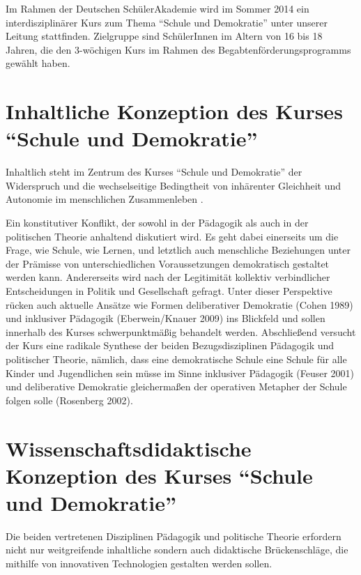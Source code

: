 \documentclass[11pt,a4paper,oneside]{article}
\begin{document}


Im Rahmen der Deutschen SchülerAkademie wird im Sommer 2014 ein interdisziplinärer Kurs zum Thema ``Schule und Demokratie'' unter unserer Leitung stattfinden.
Zielgruppe sind SchülerInnen im Altern von 16 bis 18 Jahren, die den 3-wöchigen Kurs im Rahmen des Begabtenförderungsprogramms gewählt haben.

\section{Inhaltliche Konzeption des Kurses ``Schule und Demokratie''}

Inhaltlich steht im Zentrum des Kurses ``Schule und Demokratie'' der Widerspruch und die wechselseitige Bedingtheit von inhärenter Gleichheit und Autonomie im menschlichen Zusammenleben \cite{Habermas1999a}.

Ein konstitutiver Konflikt, der sowohl in der Pädagogik als auch in der politischen Theorie anhaltend diskutiert wird.
Es geht dabei einerseits um die Frage, wie Schule, wie Lernen, und letztlich auch menschliche Beziehungen unter der Prämisse von unterschiedlichen Voraussetzungen demokratisch gestaltet werden kann.
Andererseits wird nach der Legitimität kollektiv verbindlicher Entscheidungen in Politik und Gesellschaft gefragt.
Unter dieser Perspektive rücken auch aktuelle Ansätze wie Formen deliberativer Demokratie (Cohen 1989) und inklusiver Pädagogik (Eberwein/Knauer 2009) ins Blickfeld und sollen innerhalb des Kurses schwerpunktmäßig behandelt werden.
Abschließend versucht der Kurs eine radikale Synthese der beiden Bezugsdisziplinen Pädagogik und politischer Theorie, nämlich, dass eine demokratische Schule eine Schule für alle Kinder und Jugendlichen sein müsse im Sinne inklusiver Pädagogik (Feuser 2001) und deliberative Demokratie gleichermaßen der operativen Metapher der Schule folgen solle (Rosenberg 2002).

\section{Wissenschaftsdidaktische Konzeption des Kurses ``Schule und Demokratie''}

Die beiden vertretenen Disziplinen Pädagogik und politische Theorie erfordern nicht nur weitgreifende inhaltliche sondern auch didaktische Brückenschläge, die mithilfe von innovativen Technologien gestalten werden sollen.
\end{document}
